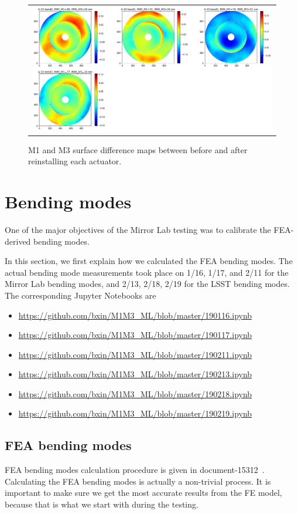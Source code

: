 \documentclass [twoside,openbib,12pt]{article}
\newcommand{\bitm}{\begin{itemize}}
\newcommand{\eitm}{\end{itemize}}
\begin{document}
 \begin{figure}[bthp]
   \begin{center}
   \begin{tabular}{c}
\includegraphics[width=150mm]{figures/reinstallDiff.png}
  \end{tabular}
   \end{center}
   \caption
  { \label{fig:reinstallDiff}
M1 and M3 surface difference maps between before and after reinstalling each actuator.
 }
\end{figure}

\section{Bending modes}

One of the major objectives of the Mirror Lab testing was to calibrate
the FEA-derived bending modes.

In this section, we first explain how we calculated the FEA bending
modes.
The actual bending mode measurements took place on 1/16, 1/17, and
2/11 for the Mirror Lab bending modes, and 2/13, 2/18, 2/19 for the
LSST bending modes.
The corresponding Jupyter Notebooks are
\bitm
\item \url{https://github.com/bxin/M1M3_ML/blob/master/190116.ipynb}
\item \url{https://github.com/bxin/M1M3_ML/blob/master/190117.ipynb}
\item \url{https://github.com/bxin/M1M3_ML/blob/master/190211.ipynb}
\item \url{https://github.com/bxin/M1M3_ML/blob/master/190213.ipynb}
\item \url{https://github.com/bxin/M1M3_ML/blob/master/190218.ipynb}
\item \url{https://github.com/bxin/M1M3_ML/blob/master/190219.ipynb}
\eitm

\subsection{FEA bending modes}
\label{sec:feaBM}
FEA bending modes calculation procedure is given in document-15312~\cite{m1m3bmcalc}.
Calculating the FEA bending modes is actually a non-trivial process.
It is important to make sure we get the most accurate results from the
FE model, because that is what we start with during the testing. 
\end{document}
